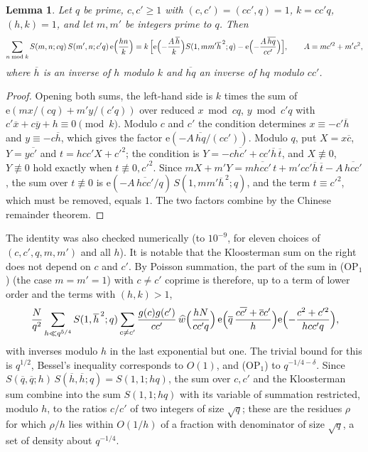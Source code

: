 \documentclass[11pt]{amsart}
\newtheorem{lemma}[theorem]{Lemma}
\theoremstyle{definition}
\theoremstyle{remark}
\numberwithin{equation}{section}
\newcommand{\e}{\mathrm e}
\newcommand{\inv}[1]{\overline{#1}}
\begin{document}
\begin{lemma}\label{lem:corr}
Let $q$ be prime, $c,c'\ge1$ with $(c,c')=(cc',q)=1$, $k=cc'q$,
$(h,k)=1$, and let $m,m'$ be integers prime to $q$.  Then
\[
 \sum_{n\bmod k}S(m,n;cq)\,S(m',n;c'q)\,\e\Bigl(\frac{hn}{k}\Bigr)
 =k\,\Bigl[\e\Bigl(-\frac{A\,\inv h}{k}\Bigr)S(1,mm'\inv h^{\,2};q)
 -\e\Bigl(-\frac{A\,\inv{hq}}{cc'}\Bigr)\Bigr],\qquad A=mc'^2+m'c^2,
\]
where $\inv h$ is an inverse of $h$ modulo $k$ and $\inv{hq}$ an inverse
of $hq$ modulo $cc'$.
\end{lemma}

\begin{proof}
Opening both sums, the left-hand side is $k$ times the sum of
$\e(mx/(cq)+m'y/(c'q))$ over reduced $x\bmod cq$, $y\bmod c'q$ with
$c'\inv x+c\inv y+h\equiv0\pmod k$.  Modulo $c$ and $c'$ the condition
determines $x\equiv-c'\inv h$ and $y\equiv-c\inv h$, which gives the factor
$\e(-A\,\inv{hq}/(cc'))$.  Modulo $q$, put $X=x\inv c$, $Y=y\inv{c'}$
and $t=hcc'X+c'^2$; the condition is $Y=-c\inv{hc'}+cc'\inv h\,\inv t$, and
$X\not\equiv0$, $Y\not\equiv0$ hold exactly when
$t\not\equiv0,c'^2$.  Since $mX+m'Y=m\inv{hcc'}\,t+m'cc'\inv h\,\inv t
-A\,\inv{hcc'}$, the sum over $t\not\equiv0$ is
$\e(-A\,\inv{hcc'}/q)\,S(1,mm'\inv h^{\,2};q)$, and the term
$t\equiv c'^2$, which must be removed, equals $1$.  The two factors
combine by the Chinese remainder theorem.
\end{proof}

The identity was also checked numerically (to $10^{-9}$, for eleven choices
of $(c,c',q,m,m')$ and all $h$).  It is notable that the Kloosterman sum on
the right does not depend on $c$ and $c'$.  By Poisson summation, the part
of the sum in (OP$_1$) (the case $m=m'=1$) with $c\ne c'$ coprime is
therefore, up to a term of lower order and the terms with $(h,k)>1$,
\[
 \frac N{q^2}\sum_{h\ll q^{5/4}}S(1,\inv h^{\,2};q)\sum_{c\ne c'}
 \frac{g(c)g(c')}{cc'}\,\widehat w\Bigl(\frac{hN}{cc'q}\Bigr)\,
 \e\Bigl(\inv q\,\frac{c\inv{c'}+\inv cc'}{h}\Bigr)
 \e\Bigl(-\frac{c^2+c'^2}{hcc'q}\Bigr),
\]
with inverses modulo $h$ in the last exponential but one.  The trivial bound
for this is $q^{1/2}$, Bessel's inequality corresponds to $O(1)$, and
(OP$_1$) to $q^{-1/4-\delta}$.  Since
$S(\inv q,\inv q;h)\,S(\inv h,\inv h;q)=S(1,1;hq)$, the sum over $c,c'$
and the Kloosterman sum combine into the sum $S(1,1;hq)$ with its variable
of summation restricted, modulo $h$, to the ratios $c/c'$ of two integers of
size $\sqrt q$; these are the residues $\rho$ for which $\rho/h$ lies within
$O(1/h)$ of a fraction with denominator of size $\sqrt q$, a set of density
about $q^{-1/4}$.
\end{document}
